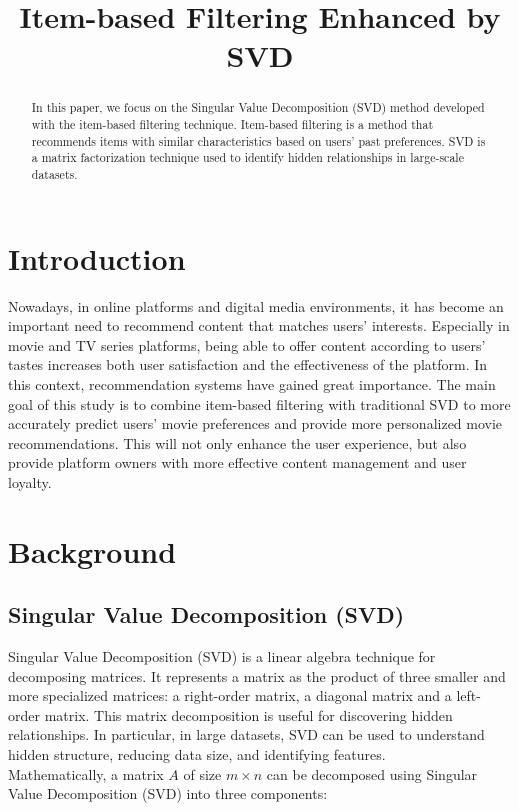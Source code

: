 \documentclass[conference]{IEEEtran}
\begin{document}
\title{Item-based Filtering Enhanced by SVD\\
}

\author{
}

\maketitle

\begin{abstract}
In this paper, we focus on the Singular Value Decomposition (SVD) method developed with the item-based filtering technique. Item-based filtering is a method that recommends items with similar characteristics based on users' past preferences. SVD is a matrix factorization technique used to identify hidden relationships in large-scale datasets.
\end{abstract}

\section{Introduction}
Nowadays, in online platforms and digital media environments, it has become an important need to recommend content that matches users' interests. Especially in movie and TV series platforms, being able to offer content according to users' tastes increases both user satisfaction and the effectiveness of the platform. In this context, recommendation systems have gained great importance. The main goal of this study is to combine item-based filtering with traditional SVD to more accurately predict users' movie preferences and provide more personalized movie recommendations. This will not only enhance the user experience, but also provide platform owners with more effective content management and user loyalty.

\section{Background}

\subsection{Singular Value Decomposition (SVD) }

Singular Value Decomposition (SVD) is a linear algebra technique for decomposing matrices. It represents a matrix as the product of three smaller and more specialized matrices: a right-order matrix, a diagonal matrix and a left-order matrix. This matrix decomposition is useful for discovering hidden relationships. In particular, in large datasets, SVD can be used to understand hidden structure, reducing data size, and identifying features. \\
Mathematically, a matrix $A$ of size $m \times n$ can be decomposed using Singular Value Decomposition (SVD) into three components:
\end{document}
